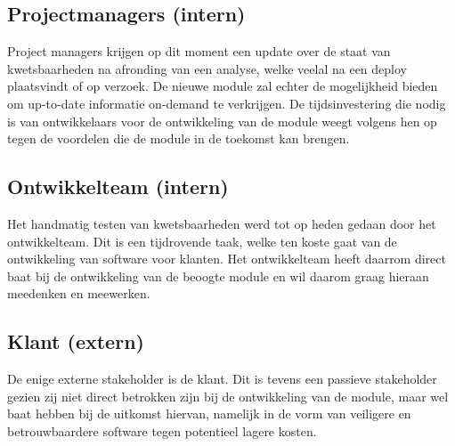 \subsection{Projectmanagers (intern)}\label{subsec:projectmanagers-(intern)1}
Project managers krijgen op dit moment een update over de staat van kwetsbaarheden na afronding van een analyse, welke veelal na een deploy plaatsvindt of op verzoek. De nieuwe module zal echter de mogelijkheid bieden om up-to-date informatie on-demand te verkrijgen.
De tijdsinvestering die nodig is van ontwikkelaars voor de ontwikkeling van de module weegt volgens hen op tegen de voordelen die de module in de toekomst kan brengen.

\subsection{Ontwikkelteam (intern)}\label{subsec:ontwikkelteam-(intern)1}
Het handmatig testen van kwetsbaarheden werd tot op heden gedaan door het ontwikkelteam. Dit is een tijdrovende taak, welke ten koste gaat van de ontwikkeling van software voor klanten. Het ontwikkelteam heeft daarrom direct baat bij de ontwikkeling van de beoogte module en wil daarom graag hieraan meedenken en meewerken.

\subsection{Klant (extern)}\label{subsec:klant-(extern)1}
De enige externe stakeholder is de klant. Dit is tevens een passieve stakeholder gezien zij niet direct betrokken zijn bij de ontwikkeling van de module, maar wel baat hebben bij de uitkomst hiervan, namelijk in de vorm van veiligere en betrouwbaardere software tegen potentieel lagere kosten.

